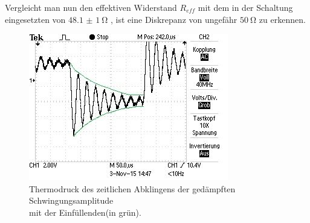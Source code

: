     Vergleicht man nun den effektiven Widerstand $R_{eff}$ mit dem in der Schaltung eingesetzten von $\SI{48,1(1)}{\ohm}$ , ist eine Diskrepanz von ungefähr $\SI{50}{\ohm}$ zu erkennen.
    \begin{figure}
    \centering
    \includegraphics{Thermo.jpg}
    \caption{Thermodruck des zeitlichen Abklingens der gedämpften Schwingungsamplitude\\ mit der Einfüllenden(in grün).}
    \label{fig:thermodruck}
    \end{figure}
    \newpage
